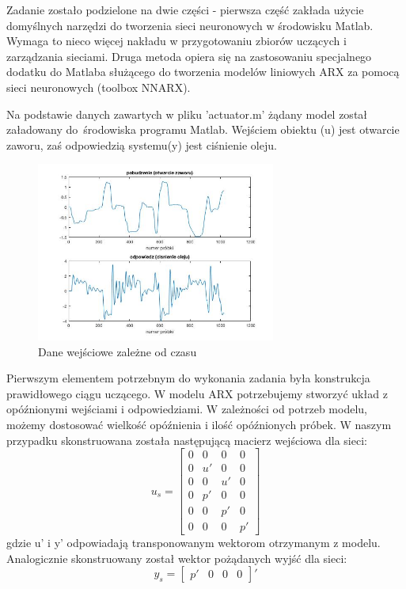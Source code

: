 \documentclass{article}
\begin{document}
Zadanie zostało podzielone na dwie części - pierwsza część zakłada użycie domyślnych
narzędzi do tworzenia sieci neuronowych w środowisku Matlab. Wymaga to nieco więcej
nakładu w przygotowaniu zbiorów uczących i zarządzania sieciami.
Druga metoda opiera się na zastosowaniu specjalnego dodatku do Matlaba służącego
do tworzenia modelów liniowych ARX za pomocą sieci neuronowych (toolbox NNARX).


Na podstawie danych zawartych w pliku 'actuator.m' żądany model został załadowany
do środowiska programu Matlab. Wejściem obiektu (u) jest
otwarcie zaworu, zaś odpowiedzią systemu(y) jest ciśnienie oleju.

\begin{figure}[H]
\centering
	\includegraphics[width=0.70\textwidth]{data.jpg}
\caption{Dane wejściowe zależne od czasu}
	\label{fig:data}
\end{figure}

Pierwszym elementem potrzebnym do wykonania zadania była konstrukcja prawidłowego ciągu uczącego.
W modelu ARX potrzebujemy stworzyć układ z opóźnionymi wejściami i odpowiedziami.
W zależności od potrzeb modelu, możemy dostosować wielkość opóźnienia i ilość opóźnionych próbek.
W naszym przypadku skonstruowana została następującą macierz wejściowa dla sieci:
\label{eq:us}
\begin{equation}
	u_s= \begin{bmatrix} 0 & 0 & 0 & 0 \\ 0 & u' & 0 & 0 \\ 0 & 0 & u' & 0 \\ 0 & p' & 0 & 0 \\ 0 & 0 & p' &  0 \\ 0 & 0 & 0 & p' \end{bmatrix}
\end{equation}
gdzie u' i y' odpowiadają transponowanym wektorom otrzymanym z modelu.
Analogicznie skonstruowany został wektor pożądanych wyjść dla sieci:
\begin{equation}
	y_s= \begin{bmatrix} p' & 0 & 0 & 0  \end{bmatrix}'
\end{equation}
\end{document}
